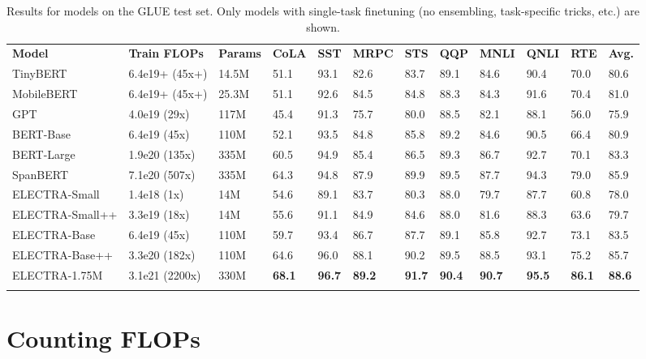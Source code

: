 \documentclass{article}
\newcommand\tstrut{\rule{0pt}{2.6ex}}
\newcommand\bstrut{\rule[-1.0ex]{0pt}{0pt}}
\newcommand{\thinline}{\Xhline{1.5\arrayrulewidth}}
\newcommand{\thickline}{\Xhline{2.5\arrayrulewidth}}
\newcommand{\tsep}	{\bstrut \\ \thinline}
\newcommand{\ttop}{\thickline}
\newcommand{\tbottom}{\bstrut \\ \thickline}
\begin{document}
\addtolength{\tabcolsep}{-4pt}
\begin{table*}[t!]
\small
\begin{center}
\begin{tabularx}{\linewidth}{X l l l l l l l l l l l}
\ttop 
\textbf{Model} & \textbf{Train FLOPs} & \textbf{Params} & \textbf{CoLA} & \textbf{SST} & \textbf{MRPC} & \textbf{STS} & \textbf{QQP} & \textbf{MNLI} & \textbf{QNLI} & \textbf{RTE} & \textbf{Avg.} \tstrut \tsep 
TinyBERT &  6.4e19+ (45x+)  & 14.5M  & 51.1 & 93.1 & 82.6 & 83.7 & 89.1 & 84.6 & 90.4 & 70.0 & 80.6 \tstrut \\
MobileBERT &  6.4e19+ (45x+)  & 25.3M  & 51.1 & 92.6 & 84.5 & 84.8 & 88.3 & 84.3 & 91.6 & 70.4 & 81.0  \\
GPT &  4.0e19 (29x)  & 117M  & 45.4 & 91.3 & 75.7 & 80.0 & 88.5 & 82.1 & 88.1 & 56.0 & 75.9 \\
BERT-Base  &  6.4e19 (45x)  & 110M  & 52.1 & 93.5 & 84.8 & 85.8 & 89.2 & 84.6 & 90.5 & 66.4 & 80.9 \\
BERT-Large &  1.9e20 (135x)  & 335M  & 60.5 & 94.9 & 85.4 & 86.5 & 89.3 & 86.7 & 92.7 & 70.1 & 83.3 \\
SpanBERT      &  7.1e20 (507x)  & 335M  & 64.3 & 94.8 & 87.9 & 89.9 & 89.5 & 87.7 & 94.3 & 79.0 & 85.9 \tsep
ELECTRA-Small &  1.4e18 (1x) & 14M  & 54.6 & 89.1 & 83.7 & 80.3 & 88.0 & 79.7 & 87.7 & 60.8 & 78.0  \tstrut \\
ELECTRA-Small++ &  3.3e19 (18x) & 14M  & 55.6 & 91.1 & 84.9 & 84.6 & 88.0 & 81.6 & 88.3 & 63.6 & 79.7  \\
ELECTRA-Base &  6.4e19 (45x) & 110M    & 59.7 & 93.4 & 86.7 & 87.7 & 89.1 & 85.8 & 92.7 & 73.1 & 83.5 \\
ELECTRA-Base++ &  3.3e20 (182x) & 110M    & 64.6 & 96.0 & 88.1 & 90.2 & 89.5 & 88.5 & 93.1 & 75.2 & 85.7 \\
ELECTRA-1.75M &  3.1e21 (2200x) & 330M    & \textbf{68.1} & \textbf{96.7} & \textbf{89.2} & \textbf{91.7} & \textbf{90.4} & \textbf{90.7} & \textbf{95.5} & \textbf{86.1} & \textbf{88.6}
\tbottom
\end{tabularx} 
\end{center}
\vspace{-1mm}
\caption{Results for models on the GLUE test set. Only models with single-task finetuning (no ensembling, task-specific tricks, etc.) are shown.}
\label{tab:basetest}
\end{table*}
\addtolength{\tabcolsep}{4pt}
\vspace{-1mm}

\section{Counting FLOPs}
\label{app:flops}
\end{document}
